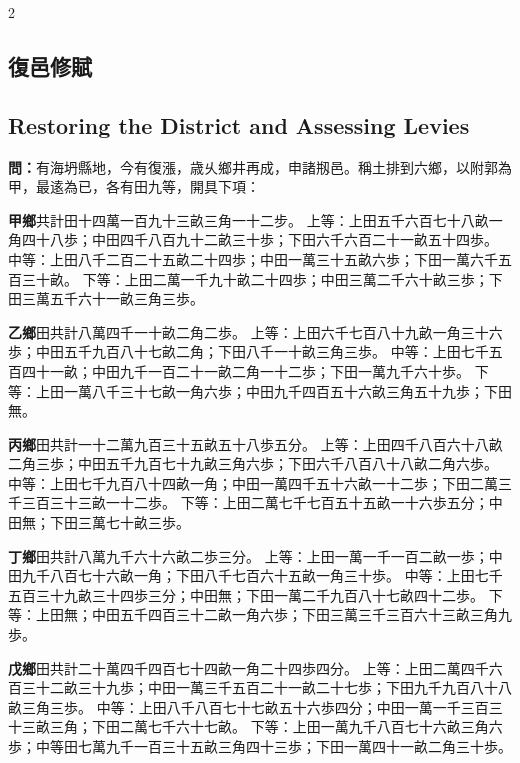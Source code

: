 \documentclass[11pt,a4paper]{article}
\newcommand{\QuestionText}[1]{\par\noindent\textbf{\color{problemcolor}問：}#1\par}
\begin{document}
\begin{paracol}{2}

\subsection*{\color{sectioncolor}復邑修賦}

\switchcolumn

\subsection*{\color{sectioncolor}Restoring the District and Assessing Levies}

\switchcolumn*

\QuestionText{有海坍縣地，今有復漲，歳乆鄉井再成，申諸剏邑。稱土排到六鄉，以附郭為甲，最逺為已，各有田九等，開具下項：

\textbf{甲鄉}共計田十四萬一百九十三畝三角一十二步。
上等：上田五千六百七十八畝一角四十八歩；中田四千八百九十二畝三十歩；下田六千六百二十一畝五十四歩。
中等：上田八千二百二十五畝二十四歩；中田一萬三十五畝六歩；下田一萬六千五百三十畝。
下等：上田二萬一千九十畝二十四歩；中田三萬二千六十畝三歩；下田三萬五千六十一畝三角三歩。

\textbf{乙鄉}田共計八萬四千一十畝二角二歩。
上等：上田六千七百八十九畝一角三十六歩；中田五千九百八十七畝二角；下田八千一十畝三角三歩。
中等：上田七千五百四十一畝；中田九千一百二十一畝二角一十二歩；下田一萬九千六十歩。
下等：上田一萬八千三十七畝一角六歩；中田九千四百五十六畝三角五十九歩；下田無。

\textbf{丙鄉}田共計一十二萬九百三十五畝五十八歩五分。
上等：上田四千八百六十八畝二角三歩；中田五千九百七十九畝三角六歩；下田六千八百八十八畝二角六歩。
中等：上田七千九百八十四畝一角；中田一萬四千五十六畝一十二歩；下田二萬三千三百三十三畝一十二歩。
下等：上田二萬七千七百五十五畝一十六歩五分；中田無；下田三萬七十畝三歩。

\textbf{丁鄉}田共計八萬九千六十六畝二歩三分。
上等：上田一萬一千一百二畝一歩；中田九千八百七十六畝一角；下田八千七百六十五畝一角三十歩。
中等：上田七千五百三十九畝三十四歩三分；中田無；下田一萬二千九百八十七畝四十二歩。
下等：上田無；中田五千四百三十二畝一角六歩；下田三萬三千三百六十三畝三角九歩。

\textbf{戊鄉}田共計二十萬四千四百七十四畝一角二十四歩四分。
上等：上田二萬四千六百三十二畝三十九歩；中田一萬三千五百二十一畝二十七歩；下田九千九百八十八畝三角三歩。
中等：上田八千八百七十七畝五十六歩四分；中田一萬一千三百三十三畝三角；下田二萬七千六十七畝。
下等：上田一萬九千八百七十六畝三角六歩；中等田七萬九千一百三十五畝三角四十三歩；下田一萬四十一畝二角三十歩。

}
\end{paracol}
\end{document}
